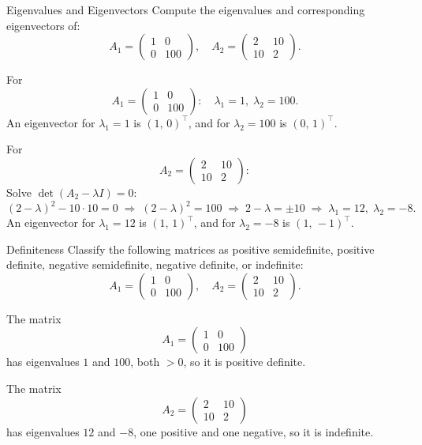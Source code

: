 \documentclass{article}
\begin{document}
\begin{exercise}{Eigenvalues and Eigenvectors}
  Compute the eigenvalues and corresponding eigenvectors of:
  \[
    A_1 = \begin{pmatrix} 1 & 0 \\ 0 & 100 \end{pmatrix},
    \quad
    A_2 = \begin{pmatrix} 2 & 10 \\ 10 & 2 \end{pmatrix}.
  \]
  
  \begin{solution}
    For 
    \[
      A_1 = \begin{pmatrix} 1 & 0 \\ 0 & 100 \end{pmatrix}:
      \quad
      \lambda_1 = 1,\; \lambda_2 = 100.
    \]
    An eigenvector for $\lambda_1=1$ is $(1,\,0)^\top$, and for $\lambda_2=100$ is $(0,\,1)^\top$.

    For 
    \[
      A_2 = \begin{pmatrix} 2 & 10 \\ 10 & 2 \end{pmatrix}:
    \]
    Solve $\det(A_2 - \lambda I)=0$:
    \[
      (2 - \lambda)^2 - 10\cdot10 = 0
      \;\Rightarrow\;
      (2-\lambda)^2 = 100
      \;\Rightarrow\;
      2-\lambda = \pm 10
      \;\Rightarrow\;
      \lambda_1 = 12,\;\lambda_2 = -8.
    \]
    An eigenvector for $\lambda_1=12$ is $(1,\,1)^\top$, and for $\lambda_2=-8$ is $(1,\,-1)^\top$.
  \end{solution}
\end{exercise}

\begin{exercise}{Definiteness}
  Classify the following matrices as positive semidefinite, positive definite, negative semidefinite, negative definite, or indefinite:
  \[
    A_1 = \begin{pmatrix} 1 & 0 \\ 0 & 100 \end{pmatrix},
    \quad
    A_2 = \begin{pmatrix} 2 & 10 \\ 10 & 2 \end{pmatrix}.
  \]
  
  \begin{solution}
    The matrix 
    \[
      A_1 = \begin{pmatrix} 1 & 0 \\ 0 & 100 \end{pmatrix}
    \]
    has eigenvalues $1$ and $100$, both $> 0$, so it is positive definite.

    The matrix 
    \[
      A_2 = \begin{pmatrix} 2 & 10 \\ 10 & 2 \end{pmatrix}
    \]
    has eigenvalues $12$ and $-8$, one positive and one negative, so it is indefinite.
  \end{solution}
\end{exercise}
\end{document}
